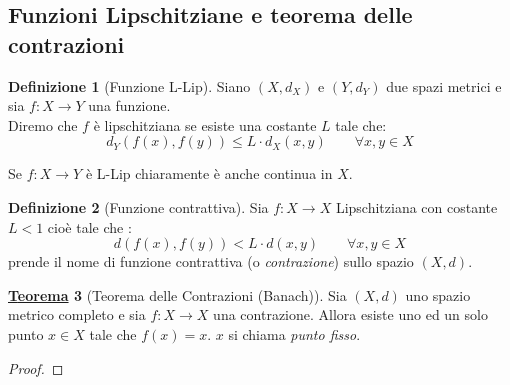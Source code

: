 \documentclass[a4paper,twoside]{article}
\theoremstyle{definition}
\newtheorem{theorem}{\color{Red}\underline{\textrm Teorema}}
\newtheorem{definizione}[theorem]{Definizione}
\numberwithin{theorem}{section}
\begin{document}
\subsection{Funzioni Lipschitziane e teorema delle contrazioni}
\begin{definizione}[Funzione L-Lip]
Siano $(X,d_X)$ e $(Y,d_Y)$ due spazi metrici e sia $f:X\to Y$ una funzione.\\ Diremo che $f$ è lipschitziana se esiste una costante $L$ tale che: $$d_Y(f(x),f(y))\leq L\cdot d_X(x,y)\qquad \forall x,y\in X$$    
\end{definizione}
Se $f:X\to Y$ è L-Lip chiaramente è anche continua in $X$.
\begin{definizione}[Funzione contrattiva]
Sia $f:X\to X$ Lipschitziana con costante $L<1$ cioè tale che :
$$d(f(x),f(y))<L\cdot d(x,y)\qquad\forall x,y\in X$$
prende il nome di funzione contrattiva (o \emph{contrazione}) sullo spazio $(X,d)$.
\end{definizione}
\begin{theorem}[Teorema delle Contrazioni (Banach)]
Sia $(X,d)$ uno spazio metrico completo e sia $f:X\to X$ una contrazione. Allora esiste uno ed un solo punto $x\in X$ tale che $f(x)=x$. $x$ si chiama \emph{punto fisso}.    
\end{theorem}
\begin{proof}
    
\end{proof}
\end{document}
